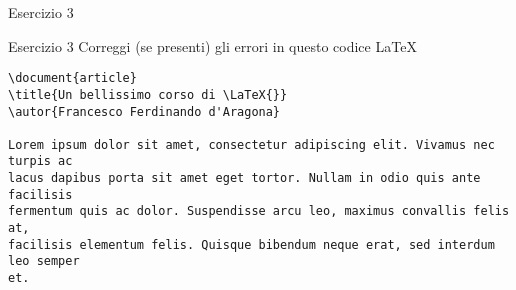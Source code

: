 \begin{frame}[fragile]{Esercizio 3}

\begin{block}{Esercizio 3}
	Correggi (se presenti) gli errori in questo codice \LaTeX{}
	\begin{lstlisting}
\document{article}
\title{Un bellissimo corso di \LaTeX{}}
\autor{Francesco Ferdinando d'Aragona}

Lorem ipsum dolor sit amet, consectetur adipiscing elit. Vivamus nec turpis ac
lacus dapibus porta sit amet eget tortor. Nullam in odio quis ante facilisis
fermentum quis ac dolor. Suspendisse arcu leo, maximus convallis felis at,
facilisis elementum felis. Quisque bibendum neque erat, sed interdum leo semper
et.
	\end{lstlisting}
\end{block}

\end{frame}